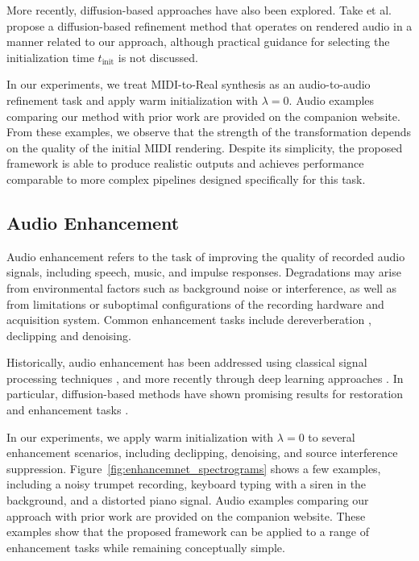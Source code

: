 \documentclass[twoside,a4paper]{article}
\begin{document}
More recently, diffusion-based approaches have also been explored. Take et al.~\cite{take2025annotationfreemiditoaudiosynthesisconcatenative} propose a diffusion-based refinement me\-thod that operates on rendered audio in a manner related to our approach, although practical guidance for selecting the initialization time $t_\text{init}$ is not discussed.

In our experiments, we treat MIDI-to-Real synthesis as an audio-to-audio refinement task and apply warm initialization with $\lambda = 0$. Audio examples comparing our method with prior work are provided on the companion website.  From these examples, we observe that the strength of the transformation depends on the quality of the initial MIDI rendering. Despite its simplicity, the proposed framework is able to produce realistic outputs and achie\-ves performance comparable to more complex pipelines designed specifically for this task.
\subsection{Audio Enhancement}
Audio enhancement refers to the task of improving the quality of recorded audio signals, including speech, music, and impulse responses. Degradations may arise from environmental factors such as background noise or interference, as well as from limitations or suboptimal configurations of the recording hardware and acquisition system. Common enhancement tasks include dereverberation \cite{moliner2024buddysinglechannelblindunsupervised}, declipping \cite{moliner2023solvingaudioinverseproblems, lee2026solvingroomimpulseresponse} and denoising\cite{godsill1998digital}.

Historically, audio enhancement has been addressed using classical signal processing techniques \cite{godsill1998digital, NIPS2000_65699726}, and more recently through deep learning approaches \cite{yu2020speech, unknown}. In particular, diffusion-based methods have shown promising results for restoration and enhancement tasks \cite{moliner2024buddysinglechannelblindunsupervised,  kandpal2022musicenhancementimagetranslation, manor2024zeroshotunsupervisedtextbasedaudio}.

In our experiments, we apply warm initialization with $\lambda = 0$ to several enhancement scenarios, including declipping, denoising, and source interference suppression. Figure~\ref{fig:enhancemnet_spectrograms} shows a few examples, including a noisy trumpet recording, keyboard typing with a siren in the background, and a distorted piano signal. Audio examples comparing our approach with prior work are provided on the companion website. These examples show that the proposed framework can be applied to a range of enhancement tasks while remaining conceptually simple.
\end{document}
